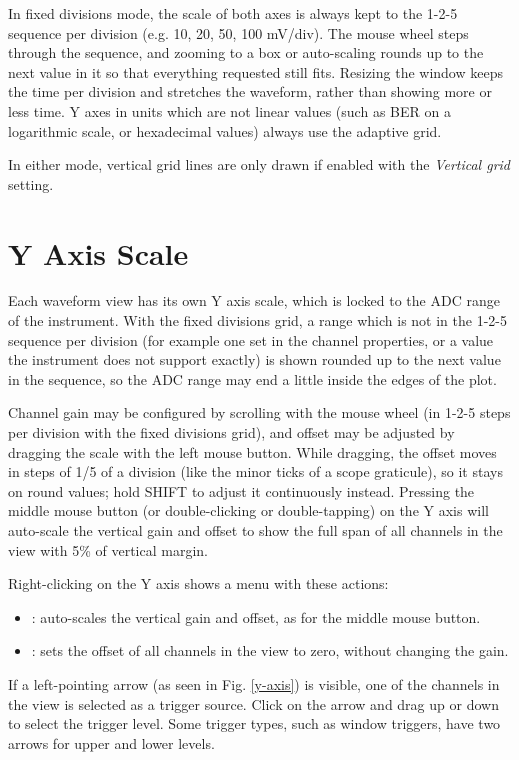 In fixed divisions mode, the scale of both axes is always kept to the 1-2-5 sequence per division (e.g. 10, 20, 50,
100 mV/div). The mouse wheel steps through the sequence, and zooming to a box or auto-scaling rounds up to the next
value in it so that everything requested still fits. Resizing the window keeps the time per division and stretches
the waveform, rather than showing more or less time. Y axes in units which are not linear values (such as BER on a
logarithmic scale, or hexadecimal values) always use the adaptive grid.

In either mode, vertical grid lines are only drawn if enabled with the \emph{Vertical grid} setting.

\section{Y Axis Scale}

Each waveform view has its own Y axis scale, which is locked to the ADC range of the instrument. With the fixed
divisions grid, a range which is not in the 1-2-5 sequence per division (for example one set in the channel
properties, or a value the instrument does not support exactly) is shown rounded up to the next value in the
sequence, so the ADC range may end a little inside the edges of the plot.

Channel gain may be configured by scrolling with the mouse wheel (in 1-2-5 steps per division with the fixed divisions
grid), and offset may be adjusted by dragging the scale with the left mouse button. While dragging, the offset moves in
steps of 1/5 of a division (like the minor ticks of a scope graticule), so it stays on round values; hold SHIFT to adjust
it continuously instead. Pressing the middle mouse button
(or double-clicking or double-tapping) on the Y axis will auto-scale the vertical gain and offset to show the full span
of all channels in the view with 5\% of vertical margin.

Right-clicking on the Y axis shows a menu with these actions:
\begin{itemize}
\item {}: auto-scales the vertical gain and offset, as for the middle mouse button.
\item {}: sets the offset of all channels in the view to zero, without changing the gain.
\end{itemize}

If a left-pointing arrow (as seen in Fig. \ref{y-axis}) is visible, one of the channels in the view is selected as a
trigger source. Click on the arrow and drag up or down to select the trigger level. Some trigger types, such as window
triggers, have two arrows for upper and lower levels.

